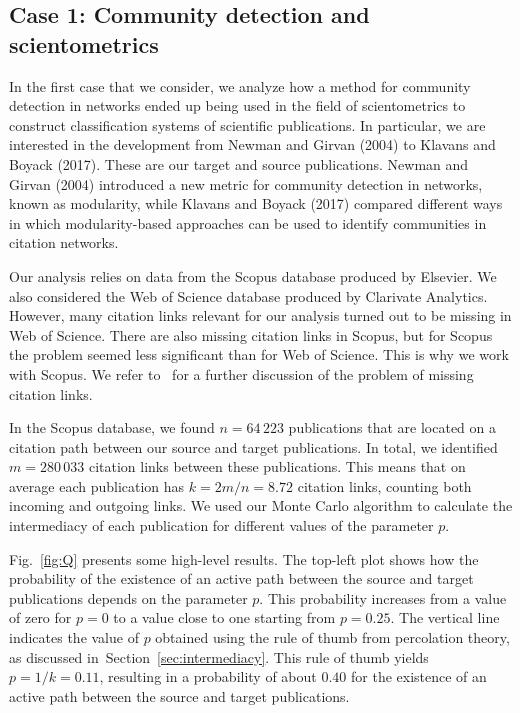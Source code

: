 \documentclass{article}
\theoremstyle{definition}
\newcommand{\secref}[1]{Section~\ref{sec:#1}\xspace}
\newcommand{\figref}[1]{Fig.~\ref{fig:#1}\xspace}
\begin{document}
\subsection{\label{sec:Q}Case 1: Community detection and scientometrics}

In the first case that we consider, we analyze how a method for community detection in networks ended up being used in the field of scientometrics to construct classification systems of scientific publications. In particular, we are interested in the development from Newman and Girvan (2004) to Klavans and Boyack (2017). These are our target and source publications. Newman and Girvan (2004) introduced a new metric for community detection in networks, known as modularity, while Klavans and Boyack (2017) compared different ways in which modularity-based approaches can be used to identify communities in citation networks.

Our analysis relies on data from the Scopus database produced by Elsevier. We also considered the Web of Science database produced by Clarivate Analytics. However, many citation links relevant for our analysis turned out to be missing in Web of Science. There are also missing citation links in Scopus, but for Scopus the problem seemed less significant than for Web of Science. This is why we work with Scopus. We refer to~\citet{VanEck2017} for a further discussion of the problem of missing citation links.

In the Scopus database, we found $n = 64\,223$ publications that are located on a citation path between our source and target publications. In total, we identified $m = 280\,033$ citation links between these publications. This means that on average each publication has $k = 2m / n = 8.72$ citation links, counting both incoming and outgoing links. We used our Monte Carlo algorithm to calculate the intermediacy of each publication for different values of the parameter $p$.

\figref{Q} presents some high-level results. The top-left plot shows how the probability of the existence of an active path between the source and target publications depends on the parameter $p$. This probability increases from a value of zero for $p = 0$ to a value close to one starting from $p = 0.25$. The vertical line indicates the value of $p$ obtained using the rule of thumb from percolation theory, as discussed in~\secref{intermediacy}. This rule of thumb yields $p = 1 / k = 0.11$, resulting in a probability of about $0.40$ for the existence of an active path between the source and target publications.
\end{document}
